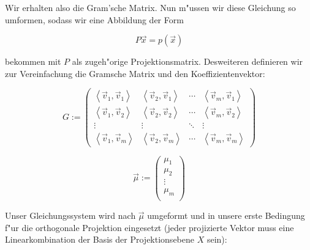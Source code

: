 \documentclass{article}
\newcommand{\lrangle}[1]{\left\langle #1 \right\rangle}
\begin{document}
Wir erhalten also die Gram'sche Matrix.
Nun m"ussen wir diese Gleichung so umformen, sodass wir eine Abbildung der Form

    \begin{equation}
        P\vec{x}=p(\vec{x})
    \end{equation}

bekommen mit \(P\) als zugeh"orige Projektionsmatrix.
Desweiteren definieren wir zur Vereinfachung die Gramsche Matrix und den
Koeffizientenvektor:

    \begin{equation}
        G :=
        \begin{pmatrix}
            \lrangle{ \vec{v}_1, \vec{v}_1 } &
            \lrangle{ \vec{v}_2, \vec{v}_1 } &
            \cdots &
            \lrangle{ \vec{v}_m, \vec{v}_1 } \\
            \lrangle{ \vec{v}_1, \vec{v}_2 } &
            \lrangle{ \vec{v}_2, \vec{v}_2 } &
            \cdots &
            \lrangle{ \vec{v}_m, \vec{v}_2 } \\
            \vdots & \vdots & \ddots & \vdots \\
            \lrangle{ \vec{v}_1, \vec{v}_m } &
            \lrangle{ \vec{v}_2, \vec{v}_m } &
            \cdots &
            \lrangle{ \vec{v}_m, \vec{v}_m }
        \end{pmatrix}
    \end{equation}

    \begin{equation}
        \vec{\mu} :=
        \begin{pmatrix}
            \mu _1 \\
            \mu _2 \\
            \vdots \\
            \mu _m \\
        \end{pmatrix}
    \end{equation}

Unser Gleichungssystem wird nach \( \vec{\mu} \) umgeformt und in unsere erste
Bedingung f"ur die orthogonale Projektion eingesetzt (jeder projizierte Vektor
muss eine Linearkombination der Basis der Projektionsebene \(X\) sein):
\end{document}
